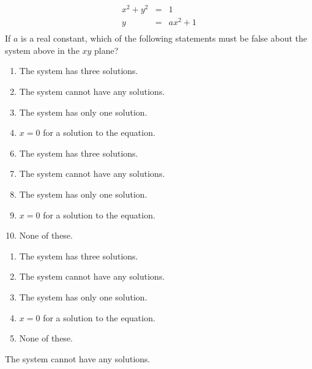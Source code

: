  \begin{eqnarray*}
x^2+y^2&=&1\\
y&=&ax^2+1\\
\end{eqnarray*}
If $a$ is a real constant, which of the following statements must be false about the system above in the $xy$ plane?


\ifsat
	\begin{enumerate}[label=\Alph*)]
		\item The system has three solutions.
		\item The system cannot have any solutions. %
		\item The system has only one solution.
		\item $x=0$ for a solution to the equation.
	\end{enumerate}
\else
\fi

\ifacteven
	\begin{enumerate}[label=\textbf{\Alph*.},itemsep=\fill,align=left]
		\setcounter{enumii}{5}
		\item The system has three solutions.
		\item The system cannot have any solutions. %
		\item The system has only one solution.
		\addtocounter{enumii}{1}
		\item $x=0$ for a solution to the equation.
		\item None of these. 
	\end{enumerate}
\else
\fi

\ifactodd
	\begin{enumerate}[label=\textbf{\Alph*.},itemsep=\fill,align=left]
		\item The system has three solutions.
		\item The system cannot have any solutions. %
		\item The system has only one solution.
		\item $x=0$ for a solution to the equation.
		\item None of these. 
	\end{enumerate}
\else
\fi

\ifgridin
 The system cannot have any solutions. %
		
\else
\fi

